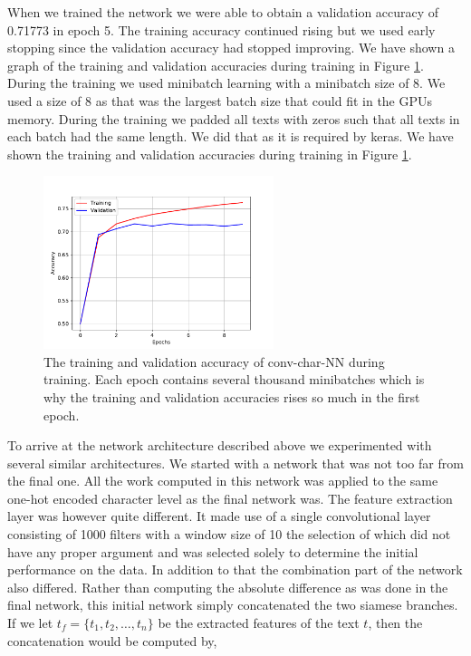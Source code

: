 When we trained the network we were able to obtain a validation accuracy of
0.71773 in epoch 5. The training accuracy continued rising but we used early
stopping since the validation accuracy had stopped improving. We have shown
a graph of the training and validation accuracies during training in Figure
\ref{fig:conv-char-NN-accuracies}. During the training we used minibatch
learning with a minibatch size of 8. We used a size of 8 as that was the largest
batch size that could fit in the GPUs memory. During the training we padded
all texts with zeros such that all texts in each batch had the same length. We
did that as it is required by keras. We have shown the training and validation
accuracies during training in Figure \ref{fig:conv-char-NN-accuracies}.

\begin{figure}
    \centering
    \includegraphics[width=0.6\textwidth]{./pictures/experiments/conv_char_nn/training_accuracy}
    \caption{The training and validation accuracy of \gls{conv-char-NN} during
        training. Each epoch contains several thousand minibatches which is why
        the training and validation accuracies rises so much in the first
        epoch.}
    \label{fig:conv-char-NN-accuracies}
\end{figure}

To arrive at the network architecture described above we experimented with
several similar architectures. We started with a network that was not too
far from the final one. All the work computed in this network was applied
to the same one-hot encoded character level as the final network was. The
feature extraction layer was however quite different. It made use of a single
convolutional layer consisting of 1000 filters with a window size of 10 the
selection of which did not have any proper argument and was selected solely
to determine the initial performance on the data. In addition to that the
combination part of the network also differed. Rather than computing the
absolute difference as was done in the final network, this initial network
simply concatenated the two siamese branches. If we let $t_f = \{t_1, t_2,
\dots, t_n\}$ be the extracted features of the text $t$, then the concatenation
would be computed by,

